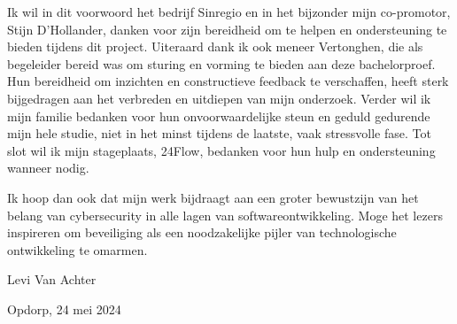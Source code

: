 Ik wil in dit voorwoord het bedrijf Sinregio en in het bijzonder mijn co-promotor, Stijn D'Hollander, danken voor zijn bereidheid om te helpen en ondersteuning te bieden  
tijdens dit project. Uiteraard dank ik ook meneer Vertonghen, die als begeleider bereid was om sturing en vorming te 
bieden aan deze bachelorproef. Hun bereidheid om inzichten en constructieve feedback te verschaffen, heeft sterk bijgedragen aan het verbreden en uitdiepen van mijn onderzoek.
Verder wil ik mijn familie bedanken voor hun onvoorwaardelijke steun en geduld gedurende mijn hele studie, niet in het minst tijdens de laatste, 
vaak stressvolle fase. Tot slot wil ik mijn stageplaats, 24Flow, bedanken voor hun hulp en ondersteuning wanneer nodig.

Ik hoop dan ook dat mijn werk bijdraagt aan een groter bewustzijn van het belang van cybersecurity in alle lagen van softwareontwikkeling. 
Moge het lezers inspireren om beveiliging als een noodzakelijke pijler van technologische ontwikkeling te omarmen.


Levi Van Achter

Opdorp, 24 mei 2024
